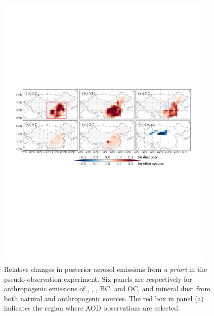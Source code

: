  \begin{figure}[t]  
  \centering  
   \includegraphics[width={0.95\textwidth}]{figures/a2.pdf}
  \caption[Relative changes in posterior aerosol emissions from
\textit{a priori} in the pseudo-observation experiment.]
{Relative changes in posterior aerosol emissions from \textit{a priori}
   in the pseudo-observation experiment.
   Six panels are respectively for anthropogenic emissions of , ,
   , BC, and OC, and mineral dust from both natural and anthropogenic sources.
   The red box in panel (a) indicates the region where AOD observations are selected. 
   \citep[Figure adopted from][]{Xu13} }
  \label{fig:pseudo1}
 \end{figure}

